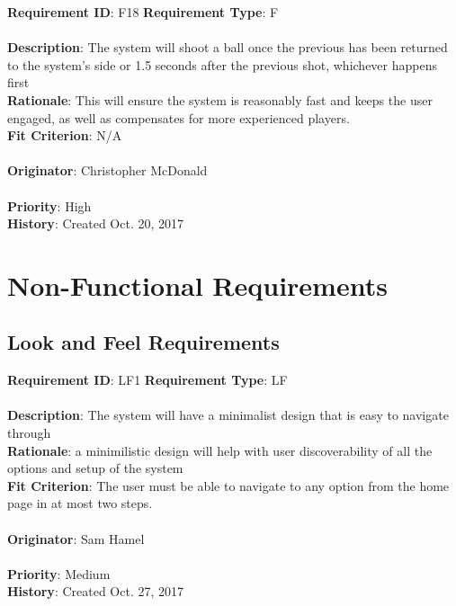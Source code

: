 \documentclass[11pt]{article}
\begin{document}
\begin{framed}
	\noindent\textbf{Requirement ID}: F18 \hfill \textbf{Requirement Type}: F \hfill\\\\
	\noindent\textbf{Description}: The system will shoot a ball once the previous has been returned to the system's side or 1.5 seconds after the previous shot, whichever happens first\\
	\textbf{Rationale}: This will ensure the system is reasonably fast and keeps the user engaged, as well as compensates for more experienced players. \\
	\textbf{Fit Criterion}: N/A \\\\
	\textbf{Originator}: Christopher McDonald \\\\
	\textbf{Priority}: High \hfill \\
	\noindent\textbf{History}: Created Oct. 20, 2017
\end{framed}

\section{Non-Functional Requirements}

\subsection{Look and Feel Requirements}
\begin{framed}
	\noindent\textbf{Requirement ID}: LF1 \hfill \textbf{Requirement Type}: LF \hfill\\\\
	\noindent\textbf{Description}: The system will have a minimalist design that is easy to navigate through \\
	\textbf{Rationale}: a minimilistic design will help with user discoverability of all the options and setup of the system  \\
	\textbf{Fit Criterion}: The user must be able to navigate to any option from the home page in at most two steps.  \\\\
	\textbf{Originator}: Sam Hamel \\\\
	\textbf{Priority}: Medium \hfill \\
	\noindent\textbf{History}: Created Oct. 27, 2017
\end{framed}
\end{document}
